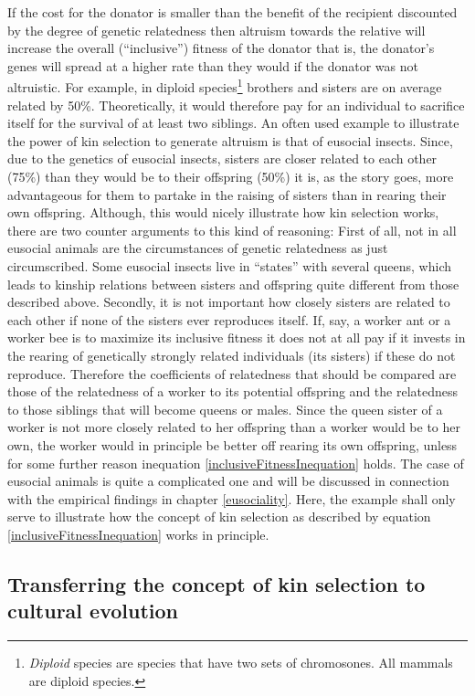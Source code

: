 If the cost for the donator is smaller than the benefit of the recipient
discounted by the degree of genetic relatedness then altruism towards the
relative will increase the overall (``inclusive'') fitness of the donator that
is, the donator's genes will spread at a higher rate than they would if the donator was
not altruistic. For example, in diploid species\footnote{{\em Diploid} species are 
species that have two sets of chromosones. All mammals are diploid species.} brothers and sisters are on
average related by 50\%. Theoretically, it would therefore pay for an
individual to sacrifice itself for the survival of at least two siblings.  An
often used example to illustrate the power of kin selection to generate
altruism is that of eusocial insects. Since, due to the genetics of eusocial
insects, sisters are closer related to each other (75\%) than they would be to
their offspring (50\%) it is, as the story goes, more advantageous for them to
partake in the raising of sisters than in rearing their own offspring.
Although, this would nicely illustrate how kin selection works, there are two
counter arguments to this kind of reasoning:
First of all, not in all eusocial animals are the circumstances of genetic
relatedness as just circumscribed.  Some eusocial insects live in ``states'' with several queens,
which leads to kinship relations between sisters and offspring quite different
from those described above.  Secondly, it is not important how closely sisters
are related to each other if none of the sisters ever reproduces itself.
If, say, a worker ant or a worker bee is to maximize its inclusive fitness it
does not at all pay if it invests in the rearing of genetically strongly
related individuals (its sisters) if these do not reproduce. Therefore the
coefficients of relatedness that should be compared are those of the
relatedness of a worker to its potential offspring and the relatedness to
those siblings that will become queens or males. Since the queen sister of a
worker is not more closely related to her offspring than a worker would be to her
own, the worker would in principle be better off rearing its own offspring,
unless for some further reason inequation \ref{inclusiveFitnessInequation}
holds. The case of eusocial animals is quite a complicated one and will be
discussed in connection with the empirical findings in chapter
\ref{eusociality}. Here, the example shall only serve to illustrate how the
concept of kin selection as described by equation
\ref{inclusiveFitnessInequation} works in principle.


\subsection{Transferring the concept of kin selection to cultural evolution}

